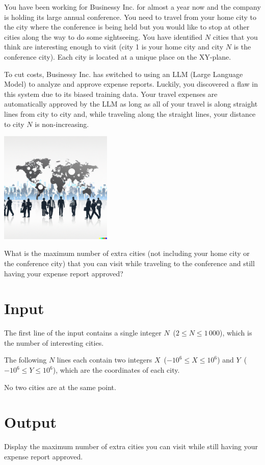 
You have been working for Businessy Inc. for almost a year now and the company is holding its large annual conference. You need to travel from your home city to the city where the conference is being held but you would like to stop at other cities along the way to do some sightseeing. You have identified $N$ cities that you think are interesting enough to visit (city 1 is your home city and city $N$ is the conference city). Each city is located at a unique place on the XY-plane.

To cut costs, Businessy Inc. has switched to using an LLM (Large Language Model) to analyze and approve expense reports. Luckily, you discovered a flaw in this system due to its biased training data. Your travel expenses are automatically approved by the LLM as long as all of your travel is along straight lines from city to city and, while traveling along the straight lines, your distance to city $N$ is non-increasing.

\begin{center}
    \includegraphics[width=0.4\textwidth]{fig}
\end{center}

What is the maximum number of extra cities (not including your home city or the conference city) that you can visit while traveling to the conference and still having your expense report approved?


\section*{Input}

The first line of the input contains a single integer $N$~($2 \leq N \le 1\,000$),
which is the number of interesting cities.

The following $N$ lines each contain two integers $X$~($-10^6 \leq X \leq 10^6$) and $Y$~($-10^6 \leq Y \leq 10^6$), which are the coordinates of each city.

No two cities are at the same point.



\section*{Output}

Display the maximum number of extra cities you can visit while still having your expense report approved.

